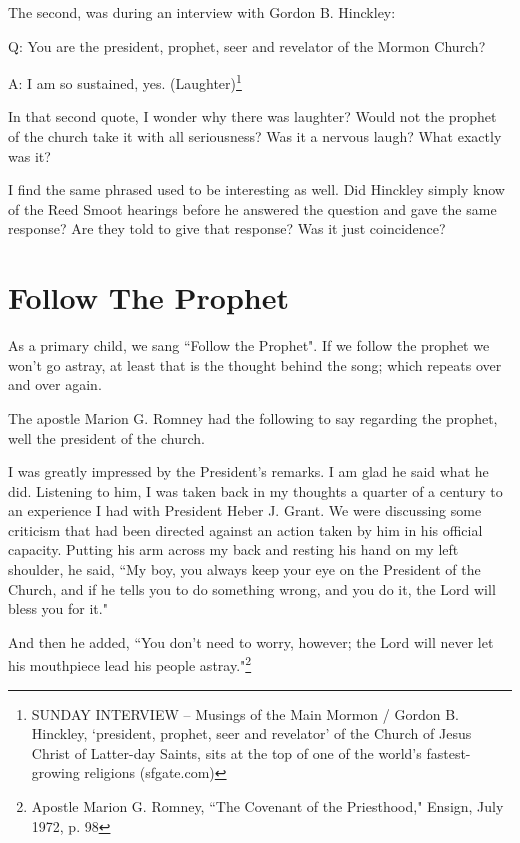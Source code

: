 The second, was during an interview with Gordon B. Hinckley:

\begin{displayquote}
Q: You are the president, prophet, seer and revelator of the Mormon Church?

A: I am so sustained, yes. (Laughter)\footnote{SUNDAY INTERVIEW -- Musings of the 
Main Mormon / Gordon B. Hinckley, `president, prophet, seer and revelator' of the 
Church of Jesus Christ of Latter-day Saints, sits at the top of one of the world's 
fastest-growing religions (sfgate.com) }
\end{displayquote}

In that second quote, I wonder why there was laughter? Would not the prophet of the
church take it with all seriousness? Was it a nervous laugh? What exactly was it?

I find the same phrased used to be interesting as well. Did Hinckley simply know of
the Reed Smoot hearings before he answered the question and gave the same response?
Are they told to give that response? Was it just coincidence?

\section{Follow The Prophet}

As a primary child, we sang ``Follow the Prophet". If we follow the prophet we won't
go astray, at least that is the thought behind the song; which repeats over and over
again.

The apostle Marion G. Romney had the following to say regarding the prophet, well the
president of the church.

\begin{displayquote}
I was greatly impressed by the President's remarks. I am glad he said what he did. 
Listening to him, I was taken back in my thoughts a quarter of a century to an 
experience I had with President Heber J. Grant. We were discussing some criticism 
that had been directed against an action taken by him in his official capacity. 
Putting his arm across my back and resting his hand on my left shoulder, he said, 
``My boy, you always keep your eye on the President of the Church, and if he tells 
you to do something wrong, and you do it, the Lord will bless you for it."

And then he added, ``You don’t need to worry, however; the Lord will never let his
mouthpiece lead his people astray."\footnote{Apostle Marion G. Romney, 
``The Covenant of the Priesthood," Ensign, July 1972, p. 98}
\end{displayquote}